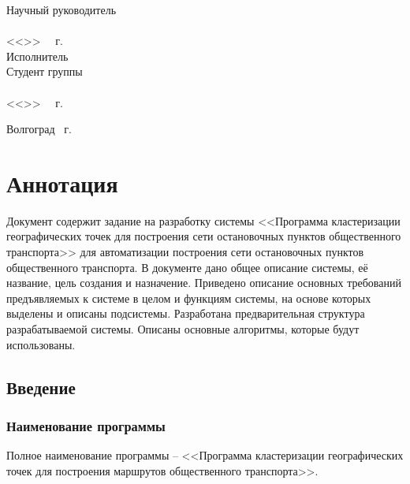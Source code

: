 \begin{minipage}[t]{0.39\textwidth}
    \begin{flushleft}
        Научный руководитель\\
        \underline{}\\
        <<\LINE{1.5em}>>\ \LINE{7em} \the\year\ г.\\
        Исполнитель\\
        Студент группы\\
        \underline{}\\
        <<\LINE{1.5em}>>\ \LINE{7em} \the\year\ г.\\
    \end{flushleft}
\end{minipage}
\vspace{\fill}
\begin{center}
    Волгоград \the\year\ г.
\end{center}
\newpage

\tocless\part{Аннотация}
Документ содержит задание на разработку системы <<Программа кластеризации географических точек для построения сети остановочных пунктов общественного транспорта>> для автоматизации построения сети остановочных пунктов общественного транспорта. В документе 
дано общее описание системы, её название, цель создания и назначение. Приведено описание основных требований 
предъявляемых к системе в целом и функциям системы, на основе которых выделены и описаны подсистемы. 
Разработана предварительная структура разрабатываемой системы. Описаны основные алгоритмы, которые будут 
использованы.
\newpage

\startcontents[sections]
\begin{changemargin}{-0.5cm}{0pt}
\end{changemargin}

\newpage

\chapter{Введение}
\section{Наименование программы}
Полное наименование программы -- <<Программа кластеризации географических точек для построения маршрутов общественного транспорта>>.

